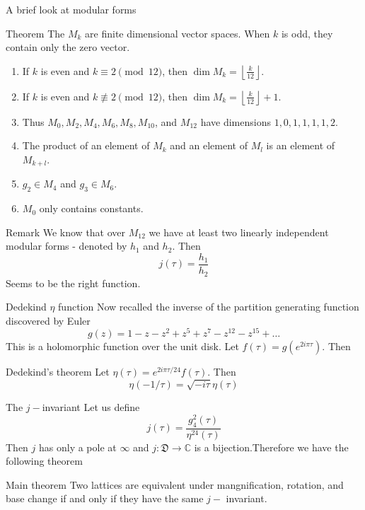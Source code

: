 \documentclass[pdf]{beamer}
\begin{document}
\begin{frame}{A brief look at modular forms}
    \begin{block}{Theorem}
        The $M_k$ are finite dimensional vector spaces. When $k$ is odd, they contain only the zero vector.
        \begin{enumerate}
            \item If $k$ is even and $k \equiv 2 \pmod{12}$, then $\dim M_k = \left\lfloor \frac{k}{12} \right\rfloor$.
            \item If $k$ is even and $k \not\equiv 2 \pmod{12}$, then $\dim M_k = \left\lfloor \frac{k}{12} \right\rfloor + 1$.
            \item Thus $M_0, M_2, M_4, M_6, M_8, M_{10}$, and $M_{12}$ have dimensions $1, 0, 1, 1, 1, 1, 2$.
            \item The product of an element of $M_k$ and an element of $M_l$ is an element of $M_{k+l}$.
            \item $g_2 \in M_4$ and $g_3 \in M_6$.
            \item $M_0$ only contains constants.
        \end{enumerate}
    \end{block}
\end{frame}
\begin{frame}{Remark}
    We know that over $M_{12}$ we have at least two linearly independent modular forms - denoted by $h_1$ and $h_2$. Then
    \[ j(\tau) = \dfrac{h_1}{h_2}\]
    Seems to be the right function.
\end{frame}
\begin{frame}{Dedekind $\eta$ function}
    Now recalled the inverse of the partition generating function discovered by Euler
    \[g(z) = 1-z-z^2+z^5+z^7 - z^{12}-z^{15}+\ldots\]
    This is a holomorphic function over the unit disk. Let $f(\tau) = g(e^{2i\pi\tau})$. Then
    \begin{block}{Dedekind's theorem}
        Let $\eta(\tau) = e^{2i\pi\tau/24}f(\tau)$. Then
        \[\eta(-1/\tau) = \sqrt{-i\tau}\eta(\tau)\]
    \end{block}
\end{frame}
\begin{frame}{The $j-$invariant}
    Let us define
    \[j(\tau) = \dfrac{g_4^2(\tau)}{\eta^{24}(\tau)}\]
    Then $j$ has only a pole at $\infty$ and $j \colon \mathfrak{D} \to \mathbb{C}$ is a bijection.\pause Therefore we have the following theorem
    \begin{block}{Main theorem}
        Two lattices are equivalent under mangnification, rotation, and base change if and only if they have the same $j-$ invariant.
    \end{block}
\end{frame}
\end{document}
